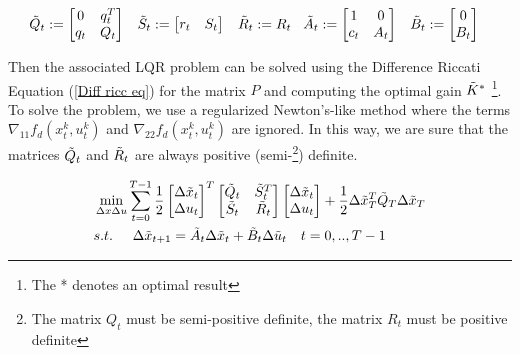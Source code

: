 \begin{equation*}
    \Tilde{Q}_t := \begin{bmatrix}
        0 & q_t^T\\
        q_t & Q_t
    \end{bmatrix} \hspace{0.3cm}
    \Tilde{S}_t := \begin{bmatrix}
        r_t & S_t
    \end{bmatrix} \hspace{0.3cm}
    \Tilde{R}_t := R_t \hspace{0.3cm}
    \Tilde{A}_t := \begin{bmatrix}
        1 & 0\\
        c_t & A_t
    \end{bmatrix} \hspace{0.3cm}
    \Tilde{B}_t := \begin{bmatrix}
        0\\
        B_t
    \end{bmatrix} \hspace{0.3cm}
\end{equation*}

Then the associated LQR problem can be solved using the Difference Riccati Equation (\ref{Diff ricc eq}) for the matrix $P$ and computing the optimal gain $\Tilde{K}^*$ \footnote{The * denotes an optimal result}. To solve the problem, we use a regularized Newton's-like method where the terms $\nabla_{11}f_d(x_t^k,u_t^k)$ and $\nabla_{22}f_d(x_t^k,u_t^k)$ are ignored. In this way, we are sure that the matrices $\Tilde{Q}_t$ and $\Tilde{R}_t$ are always positive (semi-\footnote{The matrix $Q_t$ must be semi-positive definite, the matrix $R_t$ must be positive definite}) definite.

\begin{equation}
    \begin{aligned}
    &\min_{\Delta x \Delta u} \sum_{t=0}^{T-1} 
    \frac{1}{2}\begin{bmatrix}
        \Delta\Tilde{x}_t \\
        \Delta u_t
    \end{bmatrix}^T
    \begin{bmatrix}
        \Tilde{Q}_t & \Tilde{S}_t^T\\
        \Tilde{S}_t & \Tilde{R}_t
    \end{bmatrix}
    \begin{bmatrix}
        \Delta\Tilde{x}_t \\
        \Delta u_t
    \end{bmatrix}+\frac{1}{2} \Delta\Tilde{x}_T^T\Tilde{Q}_T\Delta\Tilde{x}_T \\
    & s.t. \hspace{0.5cm} \Delta\Tilde{x}_{t+1} = \Tilde{A}_t\Delta\Tilde{x}_t + \Tilde{B}_t\Delta\Tilde{u}_t \quad t = 0,..,T-1
    \end{aligned}
\end{equation}

